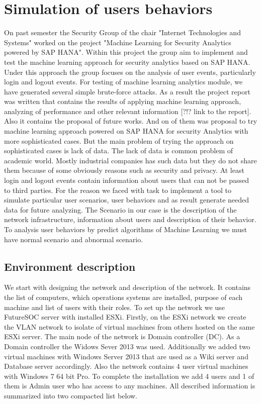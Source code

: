 \section{Simulation of users behaviors}
On past semester the Security Group of the chair "Internet Technologies and Systems" worked on the project "Machine Learning for Security Analytics powered by SAP HANA". Within this project the group aim to implement and test the machine learning approach for security analytics based on SAP HANA. Under this approach the group focuses on the analysis of user events, particularly login and logout events. For testing of machine learning analytics module, we have generated several
simple brute-force attacks. As a result the project report was written that contains the results of applying machine learning approach, analyzing of performance and other relevant information [?!? link to the report]. Also it contains the proposal of future works. And on of them was proposal to try machine learning approach powered on SAP HANA for security Analytics with more sophisticated cases. But the main problem of trying the approach on sophisticated cases is lack of data. The lack of data is common problem of academic world. Mostly industrial companies has such data but they do not share them because of some obviously reasons such as security and privacy. At least login and logout events contain information about users that can not be passed to third parties. For the reason we faced with task to implement a tool to simulate particular user scenarios, user behaviors and as result generate needed data for future analyzing. 
The Scenario in our case is the description of the network infrastructure, information about users and description of their behavior. To analysis user behaviors by predict algorithms of Machine Learning we must have normal scenario and abnormal scenario.  
  
\subsection{Environment description}
We start with designing the network and description of the network. It contains the list of computers, which operations systems are installed, purpose of each machine and list of users with their roles. To set up the network we use FutureSOC server with installed ESXi. Firstly, on the ESXi network we create the VLAN network to isolate of virtual machines from others hosted on the same ESXi server. The main node of the network is Domain controller (DC). As a Domain controller the Widows Sever 2013 was used. Additionally we added two virtual machines with Windows Server 2013 that are used as a Wiki server and Database server accordingly. Also the network contains 4 user virtual machines with Windows 7 64 bit Pro. To complete the installation  we add 4 users and 1 of them is Admin user who has access to any machines. All described information is summarized into two compacted list below. 


